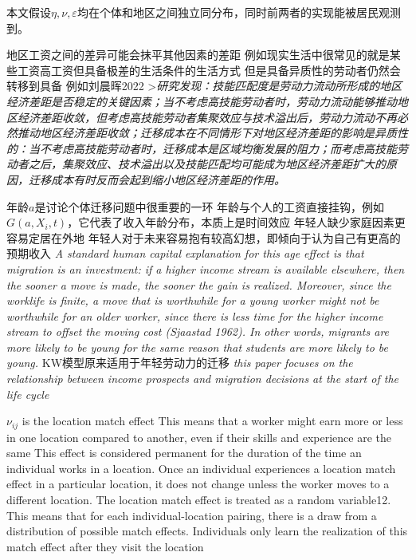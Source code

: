 \documentclass[a4paper,12pt]{article}
\begin{document}
本文假设$\eta,\nu,\varepsilon$均在个体和地区之间独立同分布，同时前两者的实现能被居民观测到。

地区工资之间的差异可能会抹平其他因素的差距
例如现实生活中很常见的就是某些工资高工资但具备极差的生活条件的生活方式
但是具备异质性的劳动者仍然会转移到具备
例如刘晨晖2022
>\textit{研究发现：技能匹配度是劳动力流动所形成的地区经济差距是否稳定的关键因素；当不考虑高技能劳动者时，劳动力流动能够推动地区经济差距收敛，但考虑高技能劳动者集聚效应与技术溢出后，劳动力流动不再必然推动地区经济差距收敛；迁移成本在不同情形下对地区经济差距的影响是异质性的：当不考虑高技能劳动者时，迁移成本是区域均衡发展的阻力；而考虑高技能劳动者之后，集聚效应、技术溢出以及技能匹配均可能成为地区经济差距扩大的原因，迁移成本有时反而会起到缩小地区经济差距的作用。}

年龄$a$是讨论个体迁移问题中很重要的一环
年龄与个人的工资直接挂钩，例如$G(a,X_i,t)$，它代表了收入年龄分布，本质上是时间效应
年轻人缺少家庭因素更容易定居在外地
年轻人对于未来容易抱有较高幻想，即倾向于认为自己有更高的预期收入
\textit{A standard human capital explanation for this age effect is that migration is an investment: if a higher income stream is  available elsewhere, then the sooner a move is made, the sooner the gain is realized. Moreover,  since the worklife is finite, a move that is worthwhile for a young worker might not be  worthwhile for an older worker, since there is less time for the higher income stream to offset  the moving cost (Sjaastad 1962). In other words, migrants are more likely to be young for the same reason that students are more likely to be young.}
KW模型原来适用于年轻劳动力的迁移
\textit{this paper focuses on the relationship between income prospects and migration decisions at the start of the life cycle}




$\nu_{ij}$ is the location match effect
This means that a worker might earn more or less in one location compared to another, even if their skills and experience are the same
This effect is considered permanent for the duration of the time an individual works in a location. Once an individual experiences a location match effect in a particular location, it does not change unless the worker moves to a different location.
The location match effect is treated as a random variable12. This means that for each individual-location pairing, there is a draw from a distribution of possible match effects. Individuals only learn the realization of this match effect after they visit the location
\end{document}
